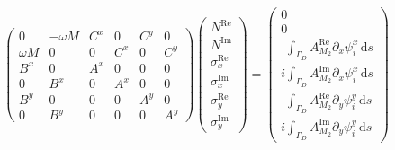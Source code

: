 \documentclass[11pt,a4paper]{article}
\begin{document}
\begin{equation}
\begin{pmatrix}
0 & -\omega M & C^x & 0 & C^y & 0\\
\omega M & 0 & 0 & C^x & 0 & C^y\\
B^x & 0 & A^x & 0 & 0 & 0\\
0 & B^x & 0 & A^x & 0 & 0\\
B^y & 0 & 0 & 0 & A^y & 0\\
0 & B^y & 0 & 0 & 0 & A^y
\end{pmatrix}
\begin{pmatrix}
N^\textrm{Re}\\
N^\textrm{Im}\\
\sigma_x^\textrm{Re}\\
\sigma_x^\textrm{Im}\\
\sigma_y^\textrm{Re}\\
\sigma_y^\textrm{Im}
\end{pmatrix}
=
\begin{pmatrix}
0\\
0\\
\phantom{i}\int_{\Gamma_D}A^\textrm{Re}_{M_2}\partial_x\psi^x_i\,\mathrm{d}s\\
i\int_{\Gamma_D}A^\textrm{Im}_{M_2}\partial_x\psi^x_i\,\mathrm{d}s\\
\phantom{i}\int_{\Gamma_D}A^\textrm{Re}_{M_2}\partial_y\psi^y_i\,\mathrm{d}s\\
i\int_{\Gamma_D}A^\textrm{Im}_{M_2}\partial_y\psi^y_i\,\mathrm{d}s
\end{pmatrix}
\end{equation}
\end{document}
